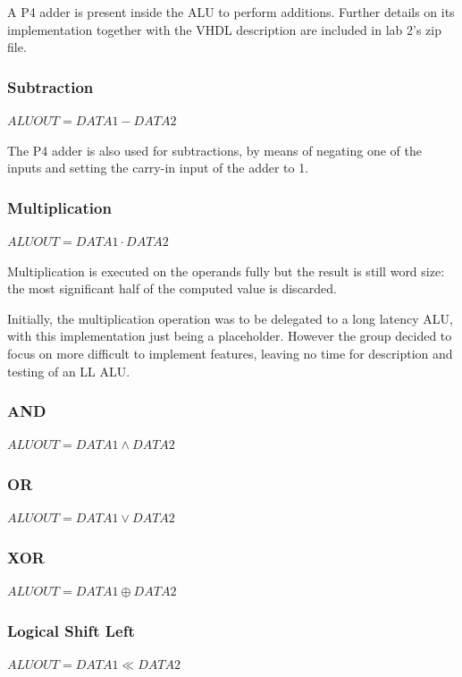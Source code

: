 A P4 adder is present inside the ALU to perform additions. Further details on its implementation together with the VHDL description are included in lab 2's zip file.

\subsubsection{Subtraction}
$ \mathit{ALUOUT} = \mathit{DATA1} - \mathit{DATA2} $


The P4 adder is also used for subtractions, by means of negating one of  the inputs and setting the carry-in input of the adder to 1.

\subsubsection{Multiplication}
$ \mathit{ALUOUT} = \mathit{DATA1} \cdot \mathit{DATA2} $


Multiplication is executed on the operands fully but the result is still word size: the most significant half of the computed value is discarded.


Initially, the multiplication operation was to be delegated to a long latency ALU, with this implementation just being a placeholder. However the group decided to focus on more difficult to implement features, leaving no time for description and testing of an LL ALU.

\subsubsection{AND}
$ \mathit{ALUOUT} = \mathit{DATA1} \wedge \mathit{DATA2} $

\subsubsection{OR}
$ \mathit{ALUOUT} = \mathit{DATA1} \lor \mathit{DATA2} $

\subsubsection{XOR}
$ \mathit{ALUOUT} = \mathit{DATA1} \oplus \mathit{DATA2} $

\subsubsection{Logical Shift Left}
$ \mathit{ALUOUT} = \mathit{DATA1} \ll \mathit{DATA2} $

